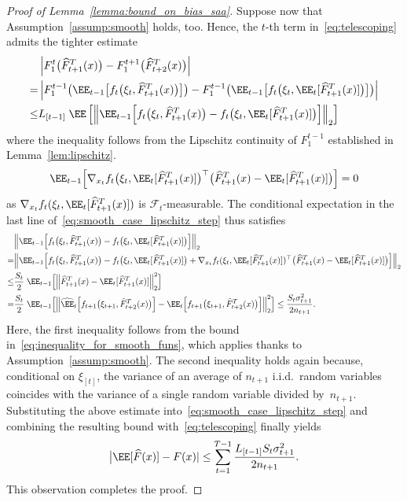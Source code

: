 \documentclass[11pt]{article}
\let\hat\widehat
\begin{document}
\begin{proof}[Proof of Lemma~\ref{lemma:bound_on_bias_saa}]
Suppose now that Assumption~\ref{assump:smooth} holds, too. Hence, the $t$-th term in~\eqref{eq:telescoping} admits the tighter estimate
\begin{equation}
\label{eq:smooth_case_lipschitz_step}
    \begin{aligned}
    & \left|F_1^t \big( \hat F_{t+1}^T(x) \big) - F_1^{t+1} \big( \hat F_{t+2}^T(x) \big) \right| \\
    = & \left| F_1^{t-1} \big( \EE_{t-1} \big[ f_t \big(\xi_t,\hat F_{t+1}^T(x) \big) \big] \big) - F_1^{t-1} \big( \EE_{t-1} \big[ f_t \big(\xi_t,\EE_t [\hat F_{t+1}^T(x)] \big) \big] \big) \right| \\
    \leq & L_{[t-1]} \; \EE \left[ \Big\|\EE_{t-1} \Big[ f_t \big(\xi_t,\hat F_{t+1}^T(x) \big) - f_t \big(\xi_t,\EE_t [\hat F_{t+1}^T(x)] \big) \Big] \Big\|_2 \right]
    \end{aligned}
\end{equation}
where the inequality follows from the Lipschitz continuity of $F_1^{t-1}$ established in Lemma~\ref{lem:lipschitz}.
\begin{align*}
    \EE_{t-1} \Big[\nabla_{x_t} f_t\big(\xi_t,\EE_t [\hat F_{t+1}^T(x)]\big) ^\top  \big(\hat F_{t+1}^T(x) - \EE_t [\hat F_{t+1}^T(x)] \big) \Big] =0
\end{align*}
as $\nabla_{x_t} f_t(\xi_t,\EE_t [\hat F_{t+1}^T(x)])$ is $\mathcal F_t$-measurable. The conditional expectation in the last line of~\eqref{eq:smooth_case_lipschitz_step} thus satisfies
\begin{align*}
    & \Big\|  \EE_{t-1} \Big[f_t \big(\xi_t,\hat F_{t+1}^T(x) \big) - f_t \big(\xi_t,\EE_t [\hat F_{t+1}^T(x)] \big)\Big]\Big\|_2  \\
    = &  \Big\|\EE_{t-1} \Big[ f_t \big(\xi_t,\hat F_{t+1}^T(x) \big) - f_t \big(\xi_t,\EE_t [\hat F_{t+1}^T(x)] \big) + \nabla_{x_t} f_t(\xi_t,\EE_t[\hat F_{t+1}^T(x)])^\top \big(\hat F_{t+1}^T(x) - \EE_t[\hat F_{t+1}^T(x)]\big) \Big]\Big\|_2  \\
   \leq &\frac{S_t}{2} \; \EE_{t-1}\Big[ \Big\|\hat F_{t+1}^T(x) - \EE_t[\hat F_{t+1}^T(x)]\Big\|_2^2 \Big] \\
   = & \frac{S_t}{2} \; \EE_{t-1} \Big[ \Big\| \hat\EE_t \Big[ f_{t+1}\big( \xi_{t+1}, \hat F_{t+2}^T(x) \big) \Big] - \EE_t \Big[ f_{t+1}\big( \xi_{t+1}, \hat F_{t+2}^T(x) \big) \Big] \Big\|_2^2\Big] \leq \frac{S_t\sigma_{t+1}^2}{2n_{t+1}}.
\end{align*}
Here, the first inequality follows from the bound in~\eqref{eq:inequality_for_smooth_funs}, which applies thanks to Assumption~\ref{assump:smooth}. The second inequality holds again because, conditional on $\xi_{[t]}$, 
the variance of an average of $n_{t+1}$ i.i.d.\ random variables coincides with the variance of a single random variable divided by~$n_{t+1}$. Substituting the above estimate into~\eqref{eq:smooth_case_lipschitz_step} and combining the resulting bound with~\eqref{eq:telescoping} finally yields 
\begin{align*}
    \big|\EE [\hat F(x)] - F(x) | \leq \sum_{t=1}^{T-1} \frac{L_{[t-1]}S_t\sigma_{t+1}^2}{2n_{t+1}}.
\end{align*}
This observation completes the proof.
\end{proof}
\end{document}
